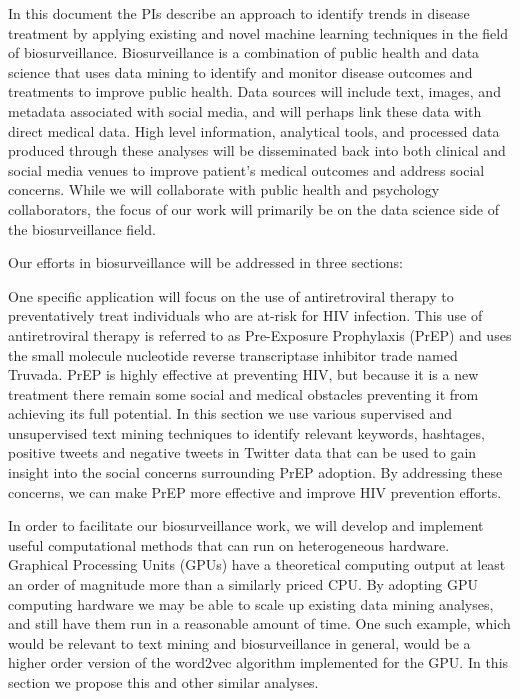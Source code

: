 


In this document the PIs describe an approach to identify trends in disease treatment by applying existing and novel machine learning techniques in the field of biosurveillance. Biosurveillance is a combination of public health and data science that uses data mining to identify and monitor disease outcomes and treatments to improve public health. Data sources will include text, images, and metadata associated with social media, and will perhaps link these data with direct medical data. High level information, analytical tools, and processed data produced through these analyses will be disseminated back into both clinical and social media venues to improve patient's medical outcomes and address social concerns. While we will collaborate with public health and psychology collaborators, the focus of our work will primarily be on the data science side of the biosurveillance field.

Our efforts in biosurveillance will be addressed in three sections:

One specific application will focus on the use of antiretroviral therapy to preventatively treat individuals who are at-risk for HIV infection. This use of antiretroviral therapy is referred to as Pre-Exposure Prophylaxis (PrEP) and uses the small molecule nucleotide reverse transcriptase inhibitor trade named Truvada. PrEP is highly effective at preventing HIV, but because it is a new treatment there remain some social and medical obstacles preventing it from achieving its full potential. In this section we use various supervised and unsupervised text mining techniques to identify relevant keywords, hashtages, positive tweets and negative tweets in Twitter data that can be used to gain insight into the social concerns surrounding PrEP adoption. By addressing these concerns, we can make PrEP more effective and improve HIV prevention efforts.

In order to facilitate our biosurveillance work, we will develop and implement useful computational methods that can run on heterogeneous hardware. Graphical Processing Units (GPUs) have a theoretical computing output at least an order of magnitude more than a similarly priced CPU. By adopting GPU computing hardware we may be able to scale up existing data mining analyses, and still have them run in a reasonable amount of time. One such example, which would be relevant to text mining and biosurveillance in general, would be a higher order version of the word2vec algorithm implemented for the GPU. In this section we propose this and other similar analyses.


